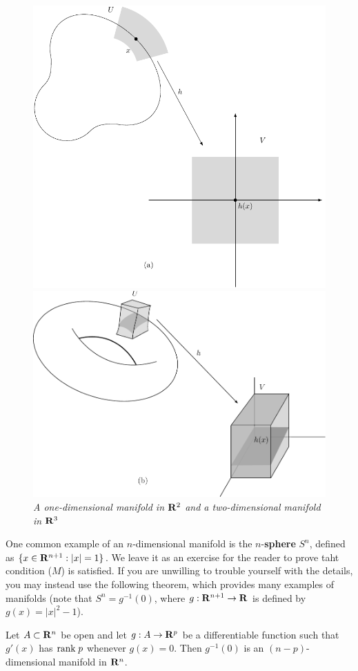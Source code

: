 \begin{figure}[!htb]
    \centering
    \includegraphics[width=.75\linewidth]{./pics/Fig5-1-(a).pdf}
    
    \includegraphics[width=.75\linewidth]{./pics/Fig5-1-(b).pdf}
    \caption{\textit{A one-dimensional manifold in $\mathbf{R}^2$ and a two-dimensional manifold in $\mathbf{R}^3$}}
    \label{Fig 5-1}
\end{figure}

One common example of an $n$-dimensional manifold is the $n$-\textbf{sphere}
$S^n$, defined as $\{x\in\mathbf{R}^{n+1}:|x|=1\}$. We leave it as an exercise for 
the reader to prove taht condition ($M$) is satisfied. If you are unwilling 
to trouble yourself with the details, you may instead use the following theorem,
which provides many examples of manifolds (note that $S^n=g^{-1}(0)$, where $g:\mathbf{R}^{n+1}\to\mathbf{R}$
is defined by $g(x)=|x|^2-1$).

\begin{theorem}
    Let $A\subset \mathbf{R}^n$ be open and let $g:A\to\mathbf{R}^p$ be a differentiable
    function such that $g'(x)$ has $\mathrm{rank}\; p$ whenever $g(x)=0$. Then $g^{-1}(0)$
    is an $(n-p)$-dimensional manifold in $\mathbf{R}^n$.
\end{theorem}

